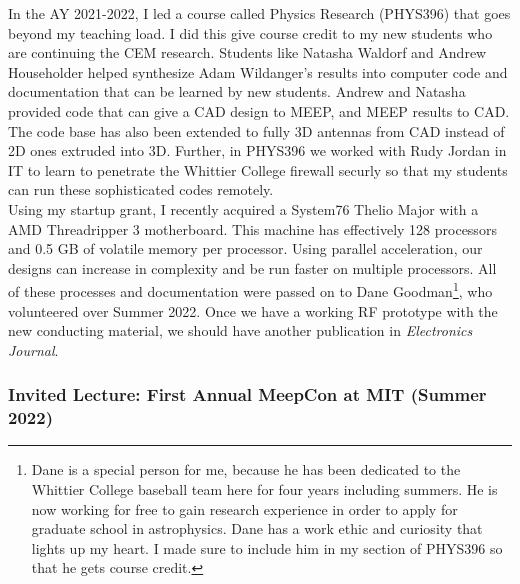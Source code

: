 \documentclass[../../../main.tex]{subfiles}
\begin{document}
In the AY 2021-2022, I led a course called Physics Research (PHYS396) that goes beyond my teaching load.  I did this give course credit to my new students who are continuing the CEM research.  Students like Natasha Waldorf and Andrew Householder helped synthesize Adam Wildanger's results into computer code and documentation that can be learned by new students.  Andrew and Natasha provided code that can give a CAD design to MEEP, and MEEP results to CAD.  The code base has also been extended to fully 3D antennas from CAD instead of 2D ones extruded into 3D.  Further, in PHYS396 we worked with Rudy Jordan in IT to learn to penetrate the Whittier College firewall securly so that my students can run these sophisticated codes remotely.
\\
\vspace{0.25cm}
Using my startup grant, I recently acquired a System76 Thelio Major with a AMD Threadripper 3 motherboard.  This machine has effectively 128 processors and 0.5 GB of volatile memory per processor.  Using parallel acceleration, our designs can increase in complexity and be run faster on multiple processors.  All of these processes and documentation were passed on to Dane Goodman\footnote{Dane is a special person for me, because he has been dedicated to the Whittier College baseball team here for four years including summers. He is now working for free to gain research experience in order to apply for graduate school in astrophysics.  Dane has a work ethic and curiosity that lights up my heart.  I made sure to include him in my section of PHYS396 so that he gets course credit.}, who volunteered over Summer 2022.  Once we have a working RF prototype with the new conducting material, we should have another publication in \textit{Electronics Journal}.

\subsubsection{Invited Lecture: First Annual MeepCon at MIT (Summer 2022)}
\end{document}
